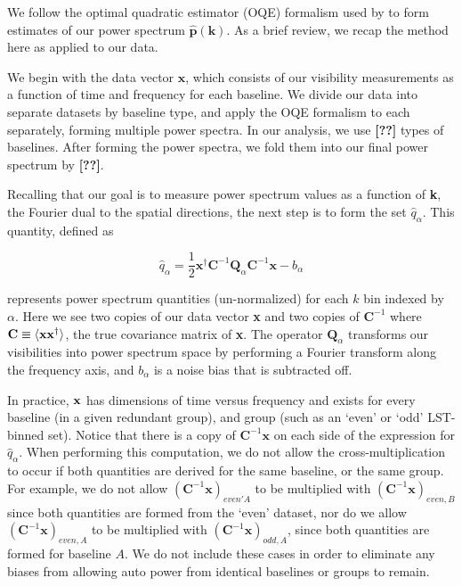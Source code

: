 \documentclass[preprint2,numberedappendix,tighten,twocolappendix]{aastex6}  %
\newcommand{\cc}[1]{{\color{purple} \textbf{[#1]}}}
\begin{document}
We follow the optimal quadratic estimator (OQE) formalism used by \citet{ali_et_al2015} to form estimates of our power spectrum $\hat{\textbf{p}}(\textbf{k})$. As a brief review, we recap the method here as applied to our data. 

We begin with the data vector $\textbf{x}$, which consists of our visibility measurements as a function of time and frequency for each baseline. We divide our data into separate datasets by baseline type, and apply the OQE formalism to each separately, forming multiple power spectra. In our analysis, we use \cc{??} types of baselines. After forming the power spectra, we fold them into our final power spectrum by \cc{??}.

Recalling that our goal is to measure power spectrum values as a function of \textbf{k}, the Fourier dual to the spatial directions, the next step is to form the set $\hat{q}_{\alpha}$. This quantity, defined as  

\begin{equation}
\label{eq:qhat}
\hat{q}_{\alpha} = \frac{1}{2}\textbf{x}^{\dagger}\textbf{C}^{-1}\textbf{Q}_{\alpha}\textbf{C}^{-1}\textbf{x}-b_{\alpha}
\end{equation}

\noindent represents power spectrum quantities (un-normalized) for each $k$ bin indexed by $\alpha$. Here we see two copies of our data vector \textbf{x} and two copies of $\textbf{C}^{-1}$ where $\bf{C} \equiv \langle\textbf{x}\textbf{x}^{\dagger}\rangle$, the true covariance matrix of \textbf{x}. The operator $\textbf{Q}_{\alpha}$ transforms our visibilities into power spectrum space by performing a Fourier transform along the frequency axis, and $b_{\alpha}$ is a noise bias that is subtracted off.

In practice, $\bf{x}$ has dimensions of time versus frequency and exists for every baseline (in a given redundant group), and group (such as an `even' or `odd' LST-binned set). Notice that there is a copy of $\textbf{C}^{-1}\textbf{x}$ on each side of the expression for $\hat{q}_{\alpha}$. When performing this computation, we do not allow the cross-multiplication to occur if both quantities are derived for the same baseline, or the same group. For example, we do not allow $(\textbf{C}^{-1}\textbf{x})_{even'A}$ to be multiplied with $(\textbf{C}^{-1}\textbf{x})_{even,B}$ since both quantities are formed from the `even' dataset, nor do we allow $(\textbf{C}^{-1}\textbf{x})_{even,A}$ to be multiplied with $(\textbf{C}^{-1}\textbf{x})_{odd,A}$, since both quantities are formed for baseline $A$. We do not include these cases in order to eliminate any biases from allowing auto power from identical baselines or groups to remain.
\end{document}
